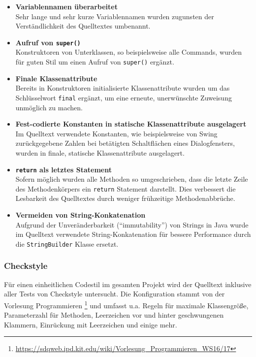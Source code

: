 \documentclass[parskip=full,11pt,twoside]{scrartcl}
\begin{document}
\begin{itemize}
  \item \textbf{Variablennamen überarbeitet}\\
        Sehr lange und sehr kurze Variablennamen wurden zugunsten der Verständlichkeit des Quelltextes umbenannt.
  \item \textbf{Aufruf von \texttt{super()}}\\
        Konstruktoren von Unterklassen, so beispielsweise alle Commands, wurden für guten Stil um einen Aufruf von \texttt{super()} ergänzt.
  \item \textbf{Finale Klassenattribute}\\
        Bereits in Konstruktoren initialisierte Klassenattribute wurden um das Schlüsselwort \texttt{final} ergänzt, um eine erneute, unerwünschte Zuweisung unmöglich zu machen.
  \item \textbf{Fest-codierte Konstanten in statische Klassenattribute ausgelagert}\\
        Im Quelltext verwendete Konstanten, wie beispielsweise von Swing zurückgegebene Zahlen bei betätigten Schaltflächen eines Dialogfensters, wurden in finale, statische Klassenattribute ausgelagert.
  \item \textbf{\texttt{return} als letztes Statement}\\
        Sofern möglich wurden alle Methoden so umgeschrieben, dass die letzte Zeile des Methodenkörpers ein \texttt{return} Statement darstellt. Dies verbessert die Lesbarkeit des Quelltextes durch weniger frühzeitige Methodenabbrüche.
  \item \textbf{Vermeiden von String-Konkatenation}\\
        Aufgrund der Unveränderbarkeit (\enquote{immutability}) von Strings in Java wurde im Quelltext verwendete String-Konkatenation für bessere Performance durch die \texttt{StringBuilder} Klasse ersetzt.
\end{itemize}

\subsubsection{Checkstyle}

Für einen einheitlichen Codestil im gesamten Projekt wird der Quelltext inklusive aller Tests von Checkstyle untersucht. Die Konfiguration stammt von der Vorlesung Programmieren \footnote{\url{https://sdqweb.ipd.kit.edu/wiki/Vorlesung_Programmieren_WS16/17}} und umfasst u.a. Regeln für maximale Klassengröße, Parameterzahl für Methoden, Leerzeichen vor und hinter geschwungenen Klammern, Einrückung mit Leerzeichen und einige mehr.
\end{document}
